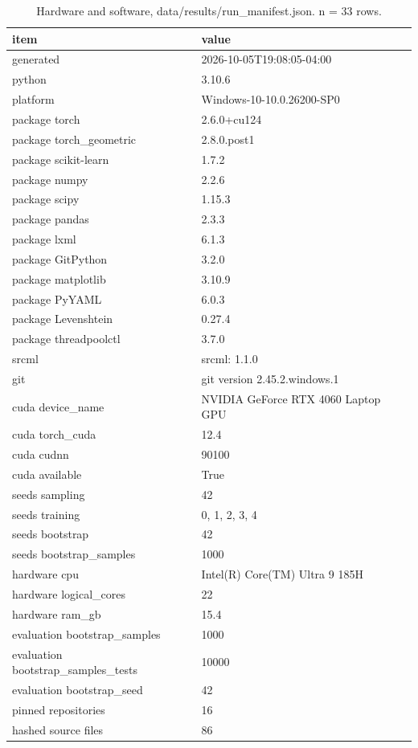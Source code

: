 \begin{table}[htbp]
\centering
\small
\caption{Hardware and software, data/results/run\_manifest.json. n = 33 rows.}
\label{tab:env_manifest}
\begin{tabular}{ll}
\toprule
item & value \\
\midrule
generated & 2026-10-05T19:08:05-04:00 \\
python & 3.10.6 \\
platform & Windows-10-10.0.26200-SP0 \\
package torch & 2.6.0+cu124 \\
package torch\_geometric & 2.8.0.post1 \\
package scikit-learn & 1.7.2 \\
package numpy & 2.2.6 \\
package scipy & 1.15.3 \\
package pandas & 2.3.3 \\
package lxml & 6.1.3 \\
package GitPython & 3.2.0 \\
package matplotlib & 3.10.9 \\
package PyYAML & 6.0.3 \\
package Levenshtein & 0.27.4 \\
package threadpoolctl & 3.7.0 \\
srcml & srcml: 1.1.0 \\
git & git version 2.45.2.windows.1 \\
cuda device\_name & NVIDIA GeForce RTX 4060 Laptop GPU \\
cuda torch\_cuda & 12.4 \\
cuda cudnn & 90100 \\
cuda available & True \\
seeds sampling & 42 \\
seeds training & 0, 1, 2, 3, 4 \\
seeds bootstrap & 42 \\
seeds bootstrap\_samples & 1000 \\
hardware cpu & Intel(R) Core(TM) Ultra 9 185H \\
hardware logical\_cores & 22 \\
hardware ram\_gb & 15.4 \\
evaluation bootstrap\_samples & 1000 \\
evaluation bootstrap\_samples\_tests & 10000 \\
evaluation bootstrap\_seed & 42 \\
pinned repositories & 16 \\
hashed source files & 86 \\
\bottomrule
\end{tabular}
\end{table}
